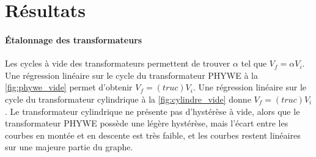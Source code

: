 \section{Résultats}

\paragraph{Étalonnage des transformateurs}
Les cycles à vide des transformateurs permettent de trouver \(\alpha\) tel que \(V_f = \alpha V_i\). Une régression linéaire sur le cycle du transformateur PHYWE à la \autoref{fig:phywe_vide} permet d'obtenir \(V_f = (truc) V_i\). Une régression linéaire sur le cycle du transformateur cylindrique à la \autoref{fig:cylindre_vide} donne \(V_f = (truc) V_i\). Le transformateur cylindrique ne présente pas d'hystérèse à vide, alors que le transformateur PHYWE possède une légère hystérèse, mais l'écart entre les courbes en montée et en descente est très faible, et les courbes restent linéaires sur une majeure partie du graphe.

